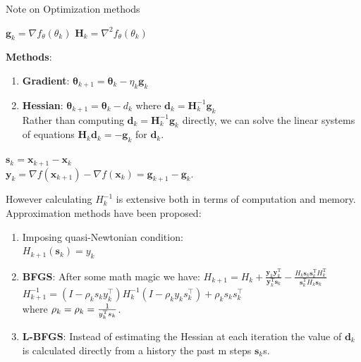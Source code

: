 \documentclass{beamer}
\begin{document}
\begin{frame}[allowframebreaks]{Note on Optimization methods}

    \begin{center}
        $\mathbf{g}_k = \nabla f_{\theta}(\theta_k) $ \hspace{10mm}
        $\mathbf{H}_k = \nabla^{2} f_{\theta}(\theta_k)$
    \end{center}
    \textbf{Methods}:
    \begin{enumerate}
        \item \textbf{Gradient}: $\boldsymbol{\theta}_{k+1} =
            \boldsymbol{\theta}_k - \eta_k \mathbf{g}_k$
        \item \textbf{Hessian}: $\boldsymbol{\theta}_{k+1} = \boldsymbol{\theta}_k - d_k$
            where $\mathbf{d}_k = \mathbf{H}_k^{-1} \mathbf{g}_k$ \\
            Rather than computing $\mathbf{d}_k = \mathbf{H}_k^{-1} \mathbf{g}_k$ directly,
            we can solve the linear systems of equations
            $\mathbf{H}_k \mathbf{d}_k = -\mathbf{g}_k$ for $\mathbf{d}_k$.
    \end{enumerate}

    \newpage

    \begin{center}
        $\mathbf{s}_k = \mathbf {x} _{k+1}-\mathbf {x} _{k}$\\
        $\mathbf{y}_k = \nabla f(\mathbf {x} _{k+1})-
                    \nabla f(\mathbf {x} _{k})
                                = \mathbf{g}_{k+1} - \mathbf{g}_{k}$. \\
    \end{center}
    However calculating $H^{-1}_k$ is extensive both in terms of computation
    and memory. Approximation methods have been proposed:
    \begin{enumerate}
        \item Imposing quasi-Newtonian condition: \\
            $H_{k+1}(\mathbf{s}_k)=y_k$\\

        \item \textbf{BFGS}: After some math magic we have:
            $H_{k+1}=H_{k}+{\frac {\mathbf {y} _{k}\mathbf {y} _{k}
            ^{\mathrm {T} }}{\mathbf {y} _{k}^{\mathrm {T} }
            \mathbf {s} _{k}}}-{\frac {H_{k}\mathbf {s} _{k}\mathbf {s} _{k}^
            {\mathrm {T} }H_{k}^{\mathrm {T} }}{\mathbf {s} _{k}^
            {\mathrm {T} }H_{k}\mathbf {s} _{k}}}$\\
            $H^{-1}_{k+1}=(I-\rho _{k}s_{k}y_{k}^{\top })
            H^{-1}_{k}(I-\rho _{k}y_{k}s_{k}^{\top })+\rho _{k}s_{k}s_{k}^{\top }$\\
            where $\rho_k = \rho_k = \frac{1}{y^{\rm T}_k s_k} $.
        \item \textbf{L-BFGS}: Instead of estimating the Hessian at each
            iteration the value of $\mathbf{d}_k$ is calculated directly from
            a history the past m steps $\mathbf{s}_k$s.
    \end{enumerate}


\end{frame}
\end{document}
